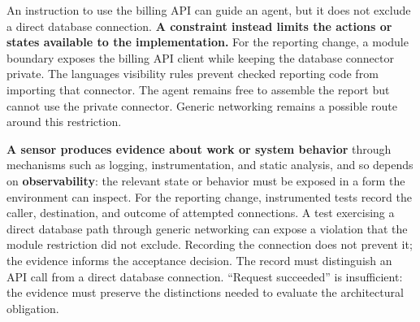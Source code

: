 An instruction to use the billing API can guide an agent, but it does not exclude a direct database connection. \textbf{A constraint instead limits the actions or states available to the implementation.} For the reporting change, a module boundary exposes the billing API client while keeping the database connector private. The language\textquotesingle s visibility rules prevent checked reporting code from importing that connector. The agent remains free to assemble the report but cannot use the private connector. Generic networking remains a possible route around this restriction.







\textbf{A sensor produces evidence about work or system behavior} through mechanisms such as logging, instrumentation, and static analysis, and so depends on \textbf{observability}: the relevant state or behavior must be exposed in a form the environment can inspect. For the reporting change, instrumented tests record the caller, destination, and outcome of attempted connections. A test exercising a direct database path through generic networking can expose a violation that the module restriction did not exclude. Recording the connection does not prevent it; the evidence informs the acceptance decision. The record must distinguish an API call from a direct database connection. ``Request succeeded'' is insufficient: the evidence must preserve the distinctions needed to evaluate the architectural obligation.

